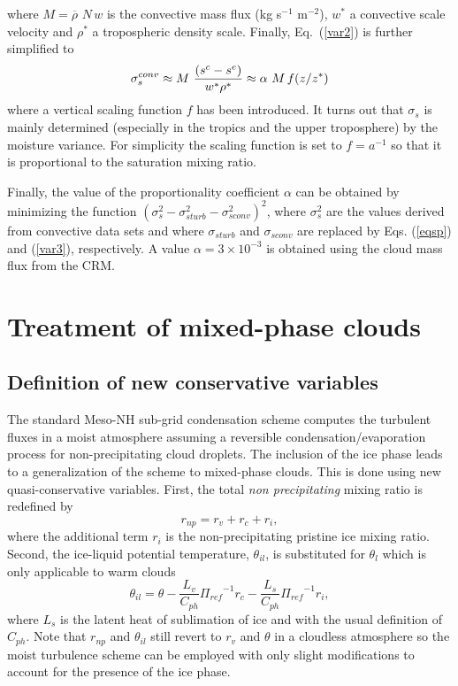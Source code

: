 \noindent where $M=\overline{\rho}\,\, N\,w$ is the convective
mass flux (kg s$^{-1}$ m$^{-2}$), $w^*$ a convective scale velocity and 
$\rho^*$ a tropospheric density scale. Finally, Eq.~(\ref{var2}) is further simplified to
\begin{equation}
\sigma_s^{conv}\approx  M\,\,{(s^c -s^e)\over w^* \rho^*} \approx \alpha\,\,M\,f(z/z^*)\label{var3}
\end{equation}
where  a vertical scaling function $f$ has been introduced.
It turns out that $\sigma_s$ is mainly determined (especially in the tropics and the upper troposphere)
by the moisture variance. For simplicity
  the scaling function is set to $f=a^{-1}$ so that it is proportional to the
saturation mixing ratio.


Finally, the  value of the proportionality coefficient $\alpha$ can be obtained by minimizing the function
$(\sigma_s^2-\sigma_{s  turb}^2-\sigma_{s  conv}^2)^2$, where $\sigma_s^2$ are the  values
derived from convective data sets
and where $\sigma_{s turb}$ and $\sigma_{s conv}$ are replaced by
Eqs. (\ref{eqsp}) and (\ref{var3}), respectively.  A value $\alpha=3\times 10^{-3}$ is obtained
using the cloud mass flux from the CRM.


\section{Treatment of mixed-phase clouds}

\subsection{Definition of new conservative variables}

The standard Meso-NH sub-grid condensation scheme computes the turbulent fluxes
in a moist atmosphere assuming a reversible condensation/evaporation process 
for non-precipitating cloud droplets. The inclusion of the ice phase leads to
a generalization of the scheme to mixed-phase clouds. This is done using new
quasi-conservative variables. First, the total {\it non precipitating} mixing 
ratio is redefined by
\begin{equation} \label{newdefrnp}
r_{np} = r_v+r_c+r_i,
\end{equation}
where the additional term $r_i$ is the non-precipitating pristine ice mixing 
ratio. Second, the ice-liquid potential temperature, $\theta_{il}$, is 
substituted for
$\theta_l$ which is only applicable to warm clouds 
\begin{equation} \label{defthetail}
\theta_{il} = \theta - {\dfrac{L_v}{C_{ph}}{\Pi_{ref}}^{-1}r_c} 
                   - {\dfrac{L_s}{C_{ph}}{\Pi_{ref}}^{-1}r_i},
\end{equation}
where $L_s$ is the latent heat of sublimation of ice and with the usual
definition of $C_{ph}$. Note that $r_{np}$ and $\theta_{il}$ still revert to 
$r_v$ and $\theta$ in a cloudless atmosphere so the moist turbulence scheme 
can be employed with only slight modifications to account for the presence of 
the ice phase. 

